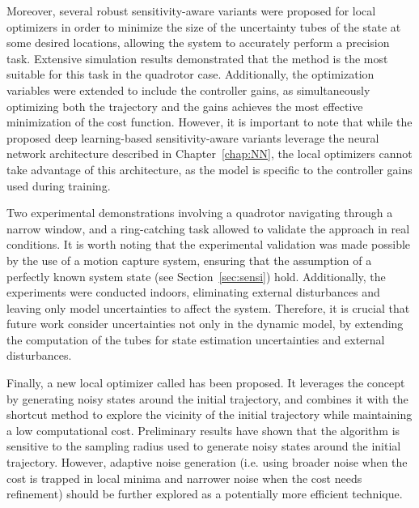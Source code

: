 Moreover, several robust sensitivity-aware variants were proposed for local optimizers in order to minimize the size of the uncertainty tubes of the state at some desired locations, allowing the system to accurately perform a precision task.
Extensive simulation results demonstrated that the  method is the most suitable for this task in the quadrotor case.
Additionally, the optimization variables were extended to include the controller gains, as simultaneously optimizing both the trajectory and the gains achieves the most effective minimization of the cost function.
However, it is important to note that while the proposed deep learning-based sensitivity-aware variants leverage the neural network architecture described in Chapter~\ref{chap:NN}, the local optimizers cannot take advantage of this architecture, as the model is specific to the controller gains used during training.

Two experimental demonstrations involving a quadrotor navigating through a narrow window, and a ring-catching task allowed to validate the approach in real conditions. 
It is worth noting that the experimental validation was made possible by the use of a motion capture system, ensuring that the assumption of a perfectly known system state (see Section~\ref{sec:sensi}) hold.
Additionally, the experiments were conducted indoors, eliminating external disturbances and leaving only model uncertainties to affect the system.
Therefore, it is crucial that future work consider uncertainties not only in the dynamic model, by extending the computation of the tubes for state estimation uncertainties and external disturbances. 

Finally, a new local optimizer called  has been proposed. 
It leverages the  concept by generating noisy states around the initial trajectory, and combines it with the shortcut method to explore the vicinity of the initial trajectory while maintaining a low computational cost.
Preliminary results have shown that the algorithm is sensitive to the sampling radius used to generate noisy states around the initial trajectory. 
However, adaptive noise generation (i.e. using broader noise when the cost is trapped in local minima and narrower noise when the cost needs refinement) should be further explored as a potentially more efficient technique.